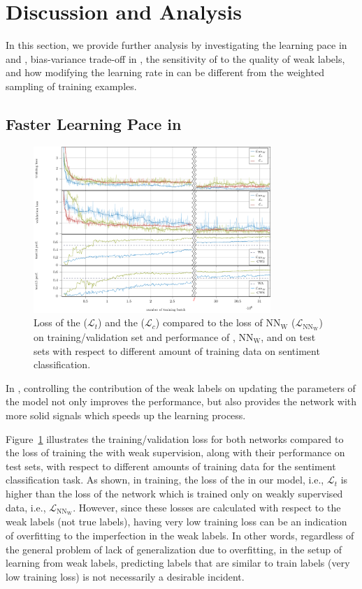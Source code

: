 \section{Discussion and Analysis}
\label{sec:discussion}
\shrink
In this section, we provide further analysis by investigating the learning pace in \cws and \fwl, bias-variance trade-off in \fwl, the sensitivity of \fwl to the quality of weak labels, and how modifying the learning rate in \fwl can be different from the weighted sampling of training examples.

\subsection{Faster Learning Pace in \cws}
\label{sec:learning_pace}
\begin{figure}[!t]%
    \centering
    \includegraphics[width=0.8\textwidth]{03-part-02/chapter-05/figs_and_tables/plot_loss_cws.pdf}
    \caption{Loss of the \tnet ($\mathcal{L}_t$) and the \cnet ($\mathcal{L}_c$) compared to the loss of $\text{NN}_{\text{W}}$ ($\mathcal{L}_{\text{NN}_{\text{W}}}$) on training/validation set and performance of \cws, $\text{NN}_{\text{W}}$, and \wa on test sets with respect to different amount of training data on sentiment classification.}
    \label{fig:plot_loss_cws}
\end{figure}
In \cws, controlling the contribution of the weak labels on updating the parameters of the model not only improves the performance, but also provides the network with more solid signals which speeds up the learning process. 

Figure~\ref{fig:plot_loss_cws} illustrates the training/validation loss for both networks compared to the loss of training the \tnet with weak supervision, along with their performance on test sets, with respect to different amounts of training data for the sentiment classification task.
As shown, in training, the loss of the \tnet in our model, i.e., $\mathcal{L}_t$ is higher than the loss of the network which is trained only on weakly supervised data, i.e., $\mathcal{L}_{\text{NN}_{\text{W}}}$. 
%
However, since these losses are calculated with respect to the weak labels (not true labels), having very low training loss can be an indication of overfitting to the imperfection in the weak labels. 
%
In other words, regardless of the general problem of lack of generalization due to overfitting, in the setup of learning from weak labels, predicting labels that are similar to train labels (very low training loss) is not necessarily a desirable incident. 

